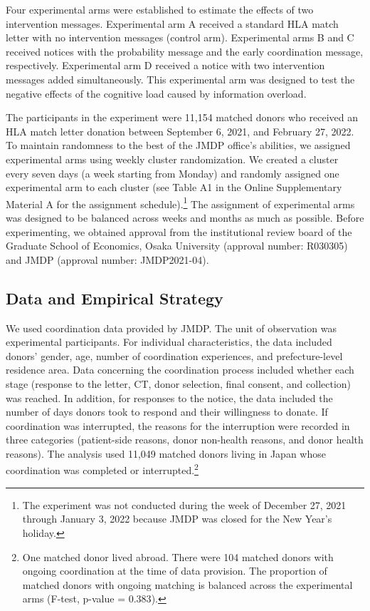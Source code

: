 \documentclass[12pt, a4paper]{article}
\begin{document}
Four experimental arms were established to estimate the effects of two intervention messages. Experimental arm A received a standard HLA match letter with no intervention messages (control arm). Experimental arms B and C received notices with the probability message and the early coordination message, respectively. Experimental arm D received a notice with two intervention messages added simultaneously. This experimental arm was designed to test the negative effects of the cognitive load caused by information overload.

The participants in the experiment were 11,154 matched donors who received an HLA match letter donation between September 6, 2021, and February 27, 2022. To maintain randomness to the best of the JMDP office's abilities, we assigned experimental arms using weekly cluster randomization. We created a cluster every seven days (a week starting from Monday) and randomly assigned one experimental arm to each cluster (see Table A1 in the Online Supplementary Material A for the assignment schedule).\footnote{The experiment was not conducted during the week of December 27, 2021 through January 3, 2022 because JMDP was closed for the New Year's holiday.} The assignment of experimental arms was designed to be balanced across weeks and months as much as possible. Before experimenting, we obtained approval from the institutional review board of the Graduate School of Economics, Osaka University (approval number: R030305) and JMDP (approval number: JMDP2021-04).

\hypertarget{data-and-empirical-strategy}{%
\subsection{Data and Empirical Strategy}\label{data-and-empirical-strategy}}

We used coordination data provided by JMDP. The unit of observation was experimental participants. For individual characteristics, the data included donors' gender, age, number of coordination experiences, and prefecture-level residence area. Data concerning the coordination process included whether each stage (response to the letter, CT, donor selection, final consent, and collection) was reached. In addition, for responses to the notice, the data included the number of days donors took to respond and their willingness to donate. If coordination was interrupted, the reasons for the interruption were recorded in three categories (patient-side reasons, donor non-health reasons, and donor health reasons). The analysis used 11,049 matched donors living in Japan whose coordination was completed or interrupted.\footnote{One matched donor lived abroad. There were 104 matched donors with ongoing coordination at the time of data provision. The proportion of matched donors with ongoing matching is balanced across the experimental arms (F-test, p-value = \(0.383\)).}
\end{document}
